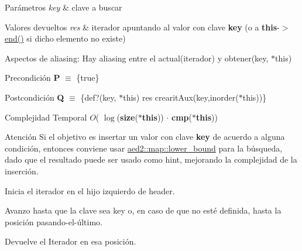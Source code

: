 \begin{DoxyParams}{Parámetros}
{\em key} & clave a buscar \\
\hline
\end{DoxyParams}

\begin{DoxyRetVals}{Valores devueltos}
{\em res} & iterador apuntando al valor con clave {\bfseries key} (o a {\bfseries this}-\/$>$\hyperlink{classaed2_1_1iterator_a67caf9468be999e9be96b7add5d79946_a67caf9468be999e9be96b7add5d79946}{end()} si dicho elemento no existe)\\
\hline
\end{DoxyRetVals}
\begin{DoxyParagraph}{Aspectos de aliasing\+:}
Hay aliasing entre el actual(iterador) y obtener(key, $\ast$this)
\end{DoxyParagraph}
\begin{DoxyPrecond}{Precondición}
{\bfseries P} $\equiv$ \{true\} 
\end{DoxyPrecond}
\begin{DoxyPostcond}{Postcondición}
{\bfseries Q} $\equiv$ \{def?(key, $\ast$this)  res  crearit\+Aux(key,inorder($\ast$this))\}
\end{DoxyPostcond}

\begin{DoxyDescription}
\item[Complejidad Temporal]$O$( $\log$({\bfseries size}({\bfseries $\ast$this})) $\cdot$ {\bfseries cmp}({\bfseries $\ast$this}))
\end{DoxyDescription}

\begin{DoxyAttention}{Atención}
Si el objetivo es insertar un valor con clave {\bfseries key} de acuerdo a alguna condición, entonces conviene usar \hyperlink{classaed2_1_1map_a62075a47afdf89267c5462f88164af3d_a62075a47afdf89267c5462f88164af3d}{aed2\+::map\+::lower\+\_\+bound} para la búsqueda, dado que el resultado puede ser usado como hint, mejorando la complejidad de la inserción.
\begin{DoxyItemize}
\item Inicia el iterador en el hijo izquierdo de header.
\item Avanzo hasta que la clave sea key o, en caso de que no esté definida, hasta la posición pasando-\/el-\/último.
\item Devuelve el Iterador en esa posición. 
\end{DoxyItemize}
\end{DoxyAttention}


